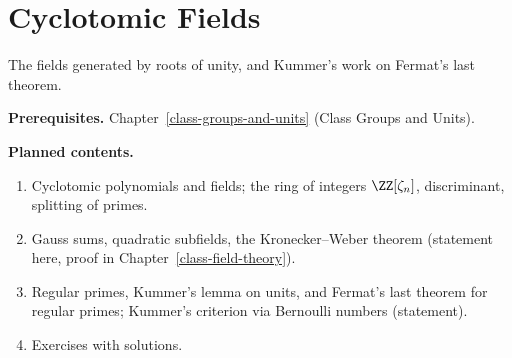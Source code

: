 \chapter{Cyclotomic Fields}\label{cyclotomic-fields}

The fields generated by roots of unity, and Kummer's work on Fermat's last theorem.

\noindent\textbf{Prerequisites.} Chapter~\ref{class-groups-and-units} (Class Groups and Units).

\noindent\textbf{Planned contents.}
\begin{enumerate}
\item Cyclotomic polynomials and fields; the ring of integers $\ZZ[\zeta_n]$, discriminant, splitting of primes.
\item Gauss sums, quadratic subfields, the Kronecker--Weber theorem (statement here, proof in Chapter~\ref{class-field-theory}).
\item Regular primes, Kummer's lemma on units, and Fermat's last theorem for regular primes; Kummer's criterion via Bernoulli numbers (statement).
\item Exercises with solutions.
\end{enumerate}
